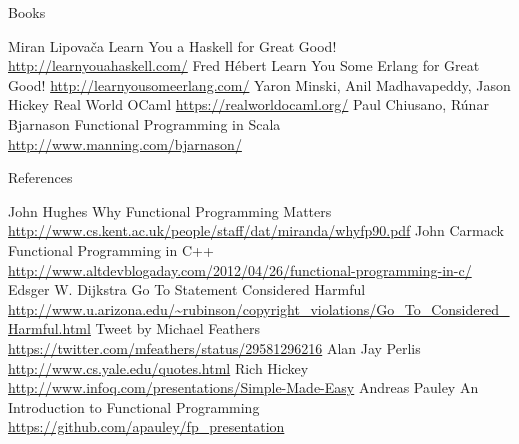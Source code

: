 \documentclass[mathserif]{beamer}
\begin{document}
\begin{frame}{Books}

  \begin{thebibliography}{10}
      Miran Lipovača
      \newblock Learn You a Haskell for Great Good!
      \newblock \url{http://learnyouahaskell.com/}
      Fred Hébert
      \newblock Learn You Some Erlang for Great Good!
      \newblock \url{http://learnyousomeerlang.com/}
      Yaron Minski, Anil Madhavapeddy, Jason Hickey
      \newblock Real World OCaml
      \newblock \url{https://realworldocaml.org/}
      Paul Chiusano, Rúnar Bjarnason
      \newblock Functional Programming in Scala
      \newblock \url{http://www.manning.com/bjarnason/}
  \end{thebibliography}

\end{frame}

\begin{frame}[allowframebreaks]{References}
  \begin{thebibliography}{10}
      John Hughes
      \newblock Why Functional Programming Matters
      \newblock \url{http://www.cs.kent.ac.uk/people/staff/dat/miranda/whyfp90.pdf}
      John Carmack
      \newblock Functional Programming in C++
      \newblock \url{http://www.altdevblogaday.com/2012/04/26/functional-programming-in-c/}
      Edsger W. Dijkstra
      \newblock Go To Statement Considered Harmful
      \newblock \url{http://www.u.arizona.edu/~rubinson/copyright_violations/Go_To_Considered_Harmful.html}
      Tweet by Michael Feathers
      \newblock \url{https://twitter.com/mfeathers/status/29581296216}
      Alan Jay Perlis
      \newblock \url{http://www.cs.yale.edu/quotes.html}
      Rich Hickey
      \newblock \url{http://www.infoq.com/presentations/Simple-Made-Easy}
      Andreas Pauley
      \newblock An Introduction to Functional Programming
      \newblock \url{https://github.com/apauley/fp_presentation}
  \end{thebibliography}
\end{frame}
\end{document}
